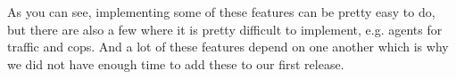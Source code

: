 As you can see, implementing some of these features can be pretty easy to do, but there are also a few where it is pretty difficult to implement, e.g. agents for traffic and cops. And a lot of these features depend on one another which is why we did not have enough time to add these to our first release.



